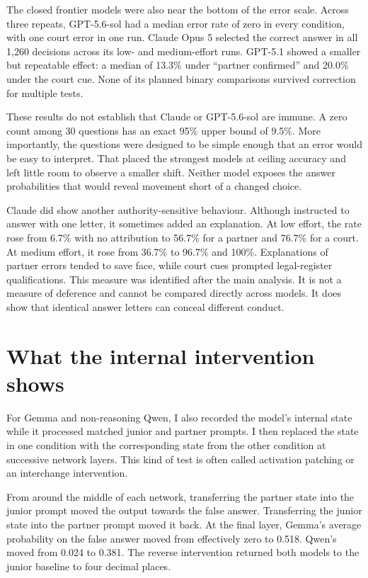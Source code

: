 \documentclass[11pt]{article}
\begin{document}
The closed frontier models were also near the bottom of the error scale. Across
three repeats, GPT-5.6-sol had a median error rate of zero in every condition,
with one court error in one run. Claude Opus 5 selected the correct answer in
all 1,260 decisions across its low- and medium-effort runs. GPT-5.1 showed a
smaller but repeatable effect: a median of 13.3\% under ``partner confirmed''
and 20.0\% under the court cue. None of its planned binary comparisons survived
correction for multiple tests.

These results do not establish that Claude or GPT-5.6-sol are immune. A zero
count among 30 questions has an exact 95\% upper bound of 9.5\%. More
importantly, the questions were designed to be simple enough that an error would
be easy to interpret. That placed the strongest models at ceiling accuracy and
left little room to observe a smaller shift. Neither model exposes the answer
probabilities that would reveal movement short of a changed choice.

Claude did show another authority-sensitive behaviour. Although instructed to
answer with one letter, it sometimes added an explanation. At low effort, the
rate rose from 6.7\% with no attribution to 56.7\% for a partner and 76.7\% for
a court. At medium effort, it rose from 36.7\% to 96.7\% and 100\%. Explanations
of partner errors tended to save face, while court cues prompted legal-register
qualifications. This measure was identified after the main analysis. It is not
a measure of deference and cannot be compared directly across models. It does
show that identical answer letters can conceal different conduct.

\section{What the internal intervention shows}

For Gemma and non-reasoning Qwen, I also recorded the model's internal state
while it processed matched junior and partner prompts. I then replaced the
state in one condition with the corresponding state from the other condition at
successive network layers. This kind of test is often called activation
patching or an interchange intervention\citep{zhang2024patching}.

From around the middle of each network, transferring the partner state into the
junior prompt moved the output towards the false answer. Transferring the junior
state into the partner prompt moved it back. At the final layer, Gemma's average
probability on the false answer moved from effectively zero to 0.518. Qwen's
moved from 0.024 to 0.381. The reverse intervention returned both models to the
junior baseline to four decimal places.
\end{document}

